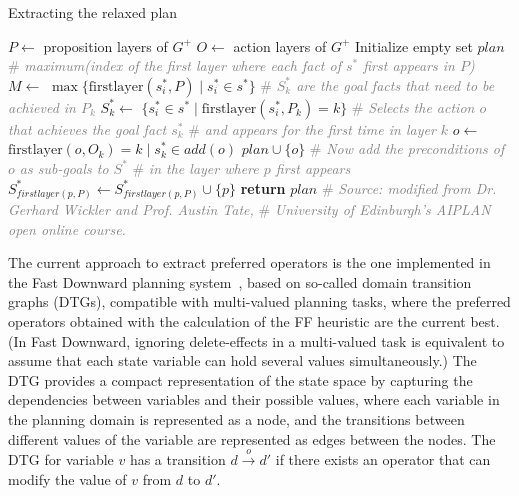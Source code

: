 \documentclass[ppgc,diss,english]{iiufrgs}
\begin{document}
\begin{algorithm}[tb]
\caption{Extracting the relaxed plan}
\label{alg:extracting-relaxed-plan}
\begin{algorithmic}[1]
  \State $P \gets$ proposition layers of $G^{+}$
  \State $O \gets$ action layers of $G^{+}$
  \State Initialize empty set $plan$
  \State \textcolor{gray}{\# \emph{maximum(index of the first layer where each fact of $s^{*}$ first appears in $P$)}}
  \State $M \gets$ $\max \{\text{firstlayer}(s_{i}^{*}, P) \mid s_{i}^{*} \in s^{*}\}$
    \State \textcolor{gray}{\# \emph{$S_{k}^{*}$ are the goal facts that need to be achieved in $P_{k}$}}
    \State $S_{k}^{*} \gets$ $\{s_{i}^{*} \in s^{*} \mid \text{firstlayer}(s_{i}^{*}, P_{k}) = k\}$
  \EndFor
      \State \textcolor{gray}{\# \emph{Selects the action $o$ that achieves the goal fact $s_{k}^{*}$}}
      \State \textcolor{gray}{\# \emph{and appears for the first time in layer $k$}}
      \State $o \gets$ $\text{firstlayer}(o, O_{k}) = k \mid s_{k}^{*} \in add(o)$
      \State $plan \cup \{o\}$
      \State \textcolor{gray}{\# \emph{Now add the preconditions of $o$ as sub-goals to $S^{*}$}}
      \State \textcolor{gray}{\# \emph{in the layer where $p$ first appears}}
        \State $S_{firstlayer(p, P)}^{*} \gets S_{firstlayer(p, P)}^{*} \cup \{p\}$
      \EndFor
    \EndFor
  \EndFor
  \State \textbf{return} $plan$
\EndProcedure
\State  \textcolor{gray}{\# \emph{Source: modified from Dr. Gerhard Wickler and Prof. Austin Tate,}}
\State \textcolor{gray}{\# \emph{University of Edinburgh's AIPLAN open online course.}}
\end{algorithmic}
\end{algorithm}


The current approach to extract preferred operators is the one implemented in the Fast Downward planning system~\cite{Helmert/2009}, based on so-called domain transition graphs (DTGs), compatible with multi-valued planning tasks, where the preferred operators obtained with the calculation of the FF heuristic are the current best. (In Fast Downward, ignoring delete-effects in a multi-valued task is equivalent to assume that each state variable can hold several values simultaneously.) The DTG provides a compact representation of the state space by capturing the dependencies between variables and their possible values, where each variable in the planning domain is represented as a node, and the transitions between different values of the variable are represented as edges between the nodes. The DTG for variable $v$ has a transition $d \xrightarrow{o} d'$ if there exists an operator that can modify the value of $v$ from $d$ to $d'$.
\end{document}
